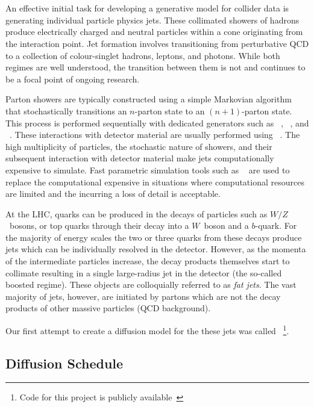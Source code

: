 \section{\pcjedi}

An effective initial task for developing a generative model for collider data is generating individual particle physics jets.
These collimated showers of hadrons produce electrically charged and neutral particles within a cone originating from the interaction point.
Jet formation involves transitioning from perturbative QCD to a collection of colour-singlet hadrons, leptons, and photons.
While both regimes are well understood, the transition between them is not and continues to be a focal point of ongoing research.

Parton showers are typically constructed using a simple Markovian algorithm that stochastically transitions an $n$-parton state to an $(n+1)$-parton state.
This process is performed sequentially with dedicated generators such as \pythia~\cite{Pythia8}, \sherpa~\cite{Sherpa}, and \herwig~\cite{Herwig}.
These interactions with detector material are usually performed using \geant~\cite{Geant4}.
The high multiplicity of particles, the stochastic nature of showers, and their subsequent interaction with detector material make jets computationally expensive to simulate.
Fast parametric simulation tools such as \delphes~\cite{Delphes} are used to replace the computational expensive \geant in situations where computational resources are limited and the incurring a loss of detail is acceptable.

At the LHC, quarks can be produced in the decays of particles such as $W/Z$~bosons, or top quarks through their decay into a $W$~boson and a $b$-quark.
For the majority of energy scales the two or three quarks from these decays produce jets which can be individually resolved in the detector.
However, as the momenta of the intermediate particles increase, the decay products themselves start to collimate resulting in a single large-radius jet in the detector (the so-called boosted regime).
These objects are colloquially referred to as \textit{fat jets}.
The vast majority of jets, however, are initiated by partons which are not the decay products of other massive particles (QCD background).

Our first attempt to create a diffusion model for the these jets was called \pcjedi~\cite{PCJedi}\footnote{Code for this project is publicly available~\cite{PCJediCode}}.

\subsection{Diffusion Schedule}


